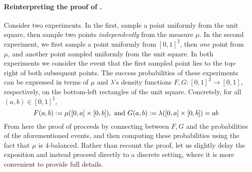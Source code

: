 \documentclass{article}
\newcommand{\eqdef}{\vcentcolon=}
\theoremstyle{remark}
\theoremstyle{plain}
\begin{document}
\paragraph{Reinterpreting the proof of \cite{kral2013quasirandom}.} Consider two experiments. In the first, sample a point uniformly from the unit square, then sample two points \emph{independently} from the measure $\mu$. In the second experiment, we first sample a point uniformly from $[0,1]^2$, then \emph{one} point from $\mu$, and another point sampled uniformly from the unit square. In both experiments we consider the event that the first sampled point lies to the top-right of both subsequent points. The success probabilities of these experiments can be expressed in terms of $\mu$ and $\lambda$'s density functions $F,G: [0,1]^2 \to [0,1]$, respectively, on the bottom-left rectangles of the unit square. Concretely, for all $(a,b) \in [0,1]^2$,
\[
    F(a,b) \eqdef \mu([0,a] \times [0,b]), \text{ and } G(a,b) \eqdef \lambda([0,a] \times [0,b]) = ab
\]
From here the proof of \cite{kral2013quasirandom} proceeds by connecting between $F,G$ and the probabilities of the aforementioned events, and then computing these probabilities using the fact that $\mu$ is $4$-balanced. Rather than recount the proof, let us slightly delay the exposition and instead proceed directly to a discrete setting, where it is more convenient to provide full details.
\end{document}
